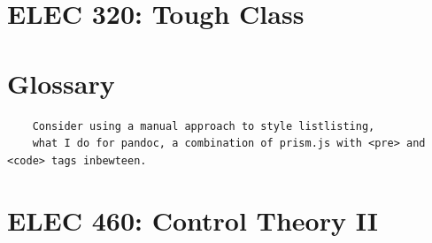 \documentclass[12pt]{book}
\begin{document}

\chapter{ELEC 320: Tough Class}







%

\chapter{Glossary}
\printglossary[title=Glossary]
\begin{lstlisting}
	Consider using a manual approach to style listlisting, 
	what I do for pandoc, a combination of prism.js with <pre> and <code> tags inbewteen.
\end{lstlisting}

\chapter{ELEC 460: Control Theory II}

\end{document}
